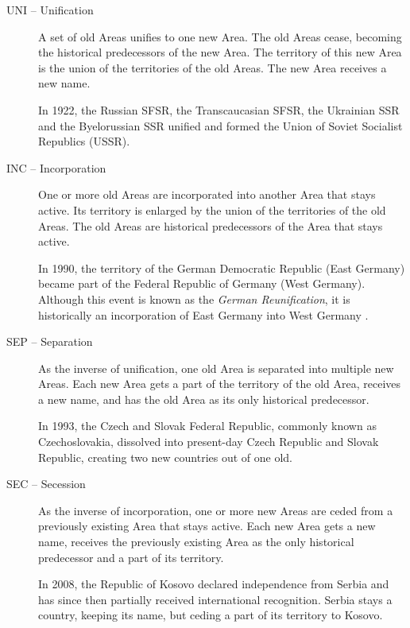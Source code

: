 \newpage
\begin{description}

  \item[UNI -- Unification]
  A set of old Areas unifies to one new Area. The old Areas cease, becoming the historical predecessors of the new Area. The territory of this new Area is the union of the territories of the old Areas. The new Area receives a new name. \\[0.25em]
  \begin{footnotesize}
    In 1922, the Russian SFSR, the Transcaucasian SFSR, the Ukrainian SSR and the Byelorussian SSR unified and formed the Union of Soviet Socialist Republics (USSR).
  \end{footnotesize}

  \item[INC -- Incorporation]
  One or more old Areas are incorporated into another Area that stays active. Its territory is enlarged by the union of the territories of the old Areas. The old Areas are historical predecessors of the Area that stays active. \\[0.25em]
  \begin{footnotesize}
    In 1990, the territory of the German Democratic Republic (East Germany) became part of the Federal Republic of Germany (West Germany). Although this event is known as the \emph{German Reunification}, it is historically an incorporation of East Germany into West Germany \cite{incorporationEastWestGermany}.
  \end{footnotesize}

  \item[SEP -- Separation]
  As the inverse of unification, one old Area is separated into multiple new Areas. Each new Area gets a part of the territory of the old Area, receives a new name, and has the old Area as its only historical predecessor. \\[0.25em]
  \begin{footnotesize}
    In 1993, the Czech and Slovak Federal Republic, commonly known as Czechoslovakia, dissolved into present-day Czech Republic and Slovak Republic, creating two new countries out of one old.
  \end{footnotesize}

  \item[SEC -- Secession]
  As the inverse of incorporation, one or more new Areas are ceded from a previously existing Area that stays active. Each new Area gets a new name, receives the previously existing Area as the only historical predecessor and a part of its territory. \\[0.25em]
  \begin{footnotesize}
    In 2008, the Republic of Kosovo declared independence from Serbia and has since then partially received international recognition. Serbia stays a country, keeping its name, but ceding a part of its territory to Kosovo.
  \end{footnotesize}


\end{description}
